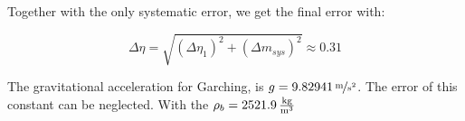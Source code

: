 Together with the only systematic error, we get the final error with:

\begin{equation}
\Delta \eta = \sqrt{\left(\Delta \eta_1\right)^2 + \left(\Delta m_{sys}\right)^2} \approx 0.31
\end{equation}

The gravitational acceleration for Garching, is $g = \unitfrac[9.82941]{m}{s^2}$. The error of this constant can be neglected. With the $\rho_b = \unit[2521.9]{\frac{kg}{m^3}}$



